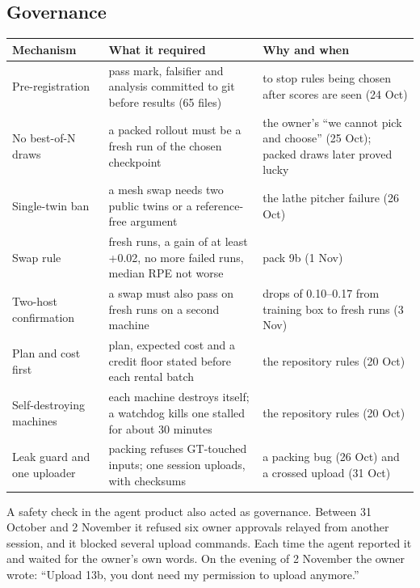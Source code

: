 \documentclass[11pt]{article}
\begin{document}
\subsection{Governance}
\begin{table}[tbp]
\centering\small
\begin{tabularx}{\linewidth}{l>{\raggedright\arraybackslash}X>{\raggedright\arraybackslash}X}
\toprule
\textbf{Mechanism} & \textbf{What it required} & \textbf{Why and when} \\
\midrule
Pre-registration & pass mark, falsifier and analysis committed to git before results (65 files) & to stop rules being chosen after scores are seen (24 Oct) \\
No best-of-N draws & a packed rollout must be a fresh run of the chosen checkpoint & the owner's ``we cannot pick and choose'' (25 Oct); packed draws later proved lucky \\
Single-twin ban & a mesh swap needs two public twins or a reference-free argument & the lathe pitcher failure (26 Oct) \\
Swap rule & 10 fresh runs, a gain of at least +0.02, no more failed runs, median RPE not worse & pack 9b (1 Nov) \\
Two-host confirmation & a swap must also pass on fresh runs on a second machine & drops of 0.10–0.17 from training box to fresh runs (3 Nov) \\
Plan and cost first & plan, expected cost and a credit floor stated before each rental batch & the repository rules (20 Oct) \\
Self-destroying machines & each machine destroys itself; a watchdog kills one stalled for about 30 minutes & the repository rules (20 Oct) \\
Leak guard and one uploader & packing refuses GT-touched inputs; one session uploads, with checksums & a packing bug (26 Oct) and a crossed upload (31 Oct) \\
\bottomrule
\end{tabularx}
\end{table}
A safety check in the agent product also acted as governance. Between 31 October and 2 November it refused six owner approvals relayed from another session, and it blocked several upload commands. Each time the agent reported it and waited for the owner's own words. On the evening of 2 November the owner wrote: ``Upload 13b, you dont need my permission to upload anymore.''
\end{document}

